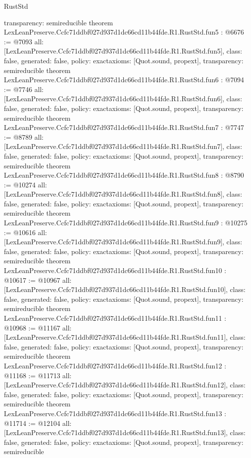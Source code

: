 \begin{lexlean}{RustStd}
\begin{coremodule}
{  transparency: semireducible
}
theorem LexLeanPreserve.Ccfc71ddbf027d937d1dc66cd11b44fde.R1.RustStd.fun5 : @6676 := @7093 {
  all: [LexLeanPreserve.Ccfc71ddbf027d937d1dc66cd11b44fde.R1.RustStd.fun5],
  class: false,
  generated: false,
  policy: exact{axioms: [Quot.sound, propext]},
  transparency: semireducible
}
theorem LexLeanPreserve.Ccfc71ddbf027d937d1dc66cd11b44fde.R1.RustStd.fun6 : @7094 := @7746 {
  all: [LexLeanPreserve.Ccfc71ddbf027d937d1dc66cd11b44fde.R1.RustStd.fun6],
  class: false,
  generated: false,
  policy: exact{axioms: [Quot.sound, propext]},
  transparency: semireducible
}
theorem LexLeanPreserve.Ccfc71ddbf027d937d1dc66cd11b44fde.R1.RustStd.fun7 : @7747 := @8789 {
  all: [LexLeanPreserve.Ccfc71ddbf027d937d1dc66cd11b44fde.R1.RustStd.fun7],
  class: false,
  generated: false,
  policy: exact{axioms: [Quot.sound, propext]},
  transparency: semireducible
}
theorem LexLeanPreserve.Ccfc71ddbf027d937d1dc66cd11b44fde.R1.RustStd.fun8 : @8790 := @10274 {
  all: [LexLeanPreserve.Ccfc71ddbf027d937d1dc66cd11b44fde.R1.RustStd.fun8],
  class: false,
  generated: false,
  policy: exact{axioms: [Quot.sound, propext]},
  transparency: semireducible
}
theorem LexLeanPreserve.Ccfc71ddbf027d937d1dc66cd11b44fde.R1.RustStd.fun9 : @10275 := @10616 {
  all: [LexLeanPreserve.Ccfc71ddbf027d937d1dc66cd11b44fde.R1.RustStd.fun9],
  class: false,
  generated: false,
  policy: exact{axioms: [Quot.sound, propext]},
  transparency: semireducible
}
theorem LexLeanPreserve.Ccfc71ddbf027d937d1dc66cd11b44fde.R1.RustStd.fun10 : @10617 := @10967 {
  all: [LexLeanPreserve.Ccfc71ddbf027d937d1dc66cd11b44fde.R1.RustStd.fun10],
  class: false,
  generated: false,
  policy: exact{axioms: [Quot.sound, propext]},
  transparency: semireducible
}
theorem LexLeanPreserve.Ccfc71ddbf027d937d1dc66cd11b44fde.R1.RustStd.fun11 : @10968 := @11167 {
  all: [LexLeanPreserve.Ccfc71ddbf027d937d1dc66cd11b44fde.R1.RustStd.fun11],
  class: false,
  generated: false,
  policy: exact{axioms: [Quot.sound, propext]},
  transparency: semireducible
}
theorem LexLeanPreserve.Ccfc71ddbf027d937d1dc66cd11b44fde.R1.RustStd.fun12 : @11168 := @11713 {
  all: [LexLeanPreserve.Ccfc71ddbf027d937d1dc66cd11b44fde.R1.RustStd.fun12],
  class: false,
  generated: false,
  policy: exact{axioms: [Quot.sound, propext]},
  transparency: semireducible
}
theorem LexLeanPreserve.Ccfc71ddbf027d937d1dc66cd11b44fde.R1.RustStd.fun13 : @11714 := @12104 {
  all: [LexLeanPreserve.Ccfc71ddbf027d937d1dc66cd11b44fde.R1.RustStd.fun13],
  class: false,
  generated: false,
  policy: exact{axioms: [Quot.sound, propext]},
  transparency: semireducible
}
\end{coremodule}
\end{lexlean}

